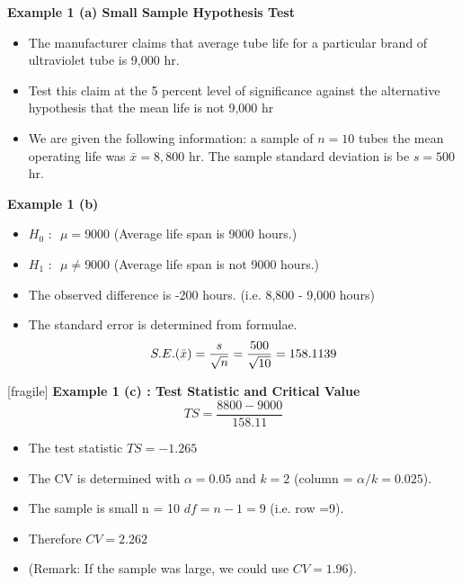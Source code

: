 \documentclass[a4]{beamer}
\begin{document}
\noindent \textbf{Example 1 (a) Small Sample Hypothesis Test}
\large
\begin{itemize}

\item The manufacturer claims that average tube life for a particular brand of ultraviolet tube
is 9,000 hr. \item Test this claim at the 5 percent level of significance against the alternative hypothesis
that the mean life is not 9,000 hr \item We are given the following information:  a sample of $n = 10$ tubes the mean operating
life was $\bar{x} = 8,800$ hr. The sample standard deviation is be $s = 500$ hr.
\end{itemize}




\noindent \textbf{Example 1 (b) }
\large
\begin{itemize}
\item $H_0 \mbox{ : } $ $\mu = 9000$ (Average life span is 9000 hours.)
\item $H_1 \mbox{ : } $ $\mu \neq 9000$ (Average life span is not 9000 hours.)
\end{itemize}
\bigskip
\begin{itemize}
\item The observed difference is -200 hours. (i.e. 8,800 - 9,000 hours)
\item The standard error is determined from formulae.
\[ S.E. (\bar{x}) = {s \over \sqrt{n}} = {500 \over \sqrt{10}}  = 158.1139 \]
\end{itemize}

[fragile]
\noindent \textbf{Example 1 (c) : Test Statistic and Critical Value }
\large
\[ TS = \frac{8800 - 9000}{158.11} \]
\begin{itemize}
\item The test statistic $TS = -1.265$
\item The CV is determined with $\alpha = 0.05$ and $k = 2$ (column = $\alpha/k=0.025$).
\item The sample is small n = 10 $df = n-1 = 9$ (i.e. row =9).
\item Therefore $CV = 2.262$

\item (Remark: If the sample was large, we could use $CV = 1.96$).

\end{itemize}
\end{document}
